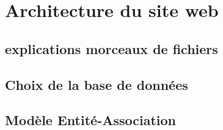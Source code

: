\chapter{Architecture du site web}

    

    \section{explications morceaux de fichiers}

    
    \section{Choix de la base de données}

        
    \section{Modèle Entité-Association}


